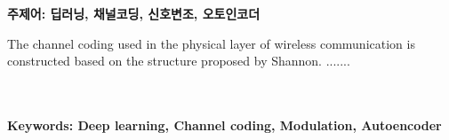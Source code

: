 \documentclass[11pt]{oblivoir}
\begin{document}
\\ \\
\textbf{주제어: 딥러닝, 채널코딩, 신호변조, 오토인코더}


\newpage

\makeabstractEng %

The channel coding used in the physical layer of wireless communication is constructed based on the structure proposed by Shannon. .......

\\ \\
\textbf{Keywords: Deep learning, Channel coding, Modulation, Autoencoder}
\end{document}
